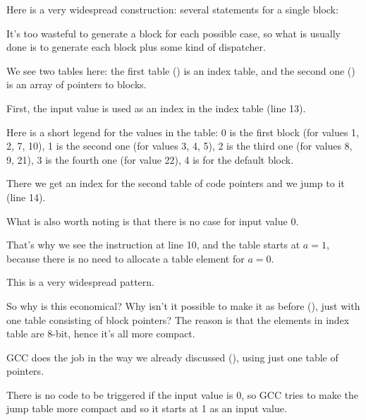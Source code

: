 
Here is a very widespread construction: several  statements for a single block:



It's too wasteful to generate a block for each possible case,
so what is usually done is to generate each block plus some kind of dispatcher.




We see two tables here: the first table () is an index table, and the second one () is an array of pointers to blocks.

First, the input value is used as an index in the index table (line 13). 

Here is a short legend for the values in the table: 
0 is the first  block (for values 1, 2, 7, 10),
1 is the second one (for values 3, 4, 5),
2 is the third one (for values 8, 9, 21),
3 is the fourth one (for value 22),
4 is for the default block.

There we get an index for the second table of code pointers and we jump to it (line 14).

What is also worth noting is that there is no case for input value 0.

That's why we see the \DEC instruction at line 10, and the table starts at $a=1$, 
because there is no need to allocate a table element for $a=0$.

This is a very widespread pattern.

So why is this economical?
Why isn't it possible to make it as before
(), just with one table consisting of block pointers?
The reason is that the elements in index table are 8-bit, hence it's all more compact.


GCC does the job in the way we already discussed (), using just one table of pointers.


There is no code to be triggered if the input value is 0, so GCC tries to make the jump table more compact
and so it starts at 1 as an input value.

